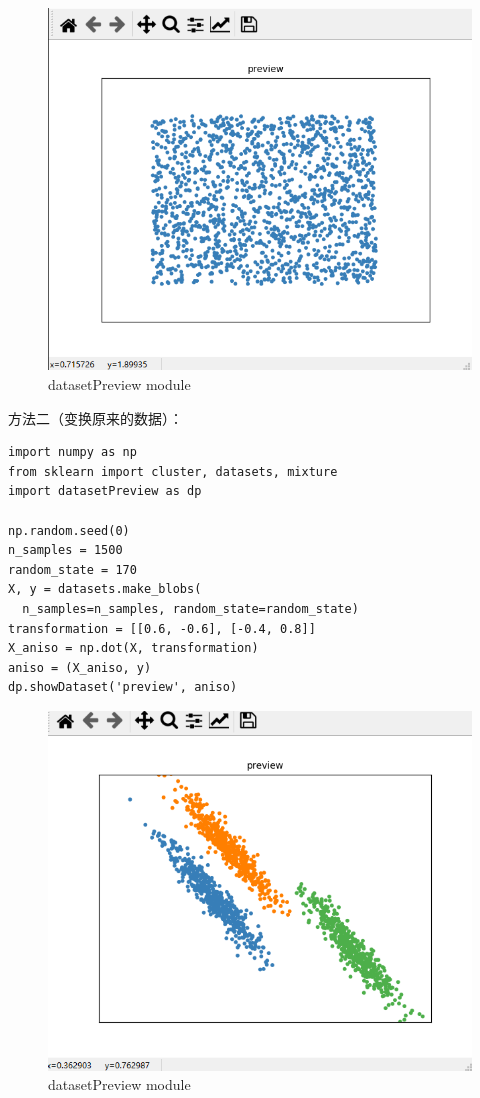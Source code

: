 \documentclass[UTF8]{ctexart}
\begin{document}
\begin{figure}[ht]
\centering
\includegraphics[scale=0.5]{otherDataset.png}
\caption{datasetPreview module}
\end{figure}

方法二（变换原来的数据）：
\begin{lstlisting}[style=stylePy]
import numpy as np
from sklearn import cluster, datasets, mixture
import datasetPreview as dp

np.random.seed(0)  
n_samples = 1500
random_state = 170
X, y = datasets.make_blobs(
  n_samples=n_samples, random_state=random_state)
transformation = [[0.6, -0.6], [-0.4, 0.8]]
X_aniso = np.dot(X, transformation)
aniso = (X_aniso, y)
dp.showDataset('preview', aniso)
\end{lstlisting}

\begin{figure}[ht]
\centering
\includegraphics[scale=0.5]{aniso.png}
\caption{datasetPreview module}
\end{figure}
\end{document}
